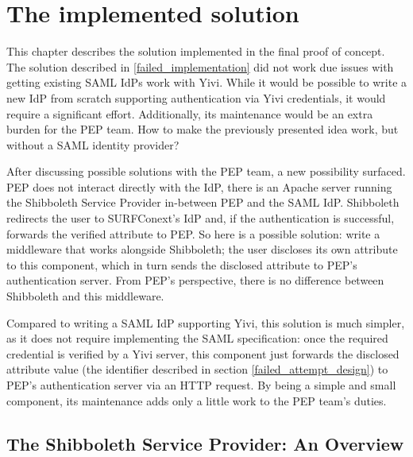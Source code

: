 \documentclass{report}
\begin{document}
\chapter{The implemented solution}
This chapter describes the solution implemented in the final proof of concept. The solution described in \ref{failed_implementation} did not work due issues with getting existing
SAML IdPs work with Yivi. While it would be possible to write a new IdP from scratch supporting authentication via Yivi credentials, it would require a significant effort.
Additionally, its maintenance would be an extra burden for the PEP team. How to make the previously presented idea work, but without a SAML identity provider? \par
After discussing possible solutions with the PEP team, a new possibility surfaced. PEP does not interact directly with the IdP, there is an Apache server running the Shibboleth Service
Provider in-between PEP and the SAML IdP. Shibboleth redirects the user to SURFConext's IdP and, if the authentication is successful, forwards the verified attribute to PEP. So
here is a possible solution: write a middleware that works alongside Shibboleth; the user discloses its own attribute to this component, which in turn sends the disclosed attribute
to PEP's authentication server. From PEP's perspective, there is no difference between Shibboleth and this middleware. \par
Compared to writing a SAML IdP supporting Yivi, this solution is much simpler, as it does not require implementing the SAML specification: once the required credential is verified
by a Yivi server, this component just forwards the disclosed attribute value (the identifier described in section \ref{failed_attempt_design}) to PEP's authentication server via
an HTTP request. By being a simple and small component, its maintenance adds only a little work to the PEP team's duties. 

\section{The Shibboleth Service Provider: An Overview}
\end{document}
